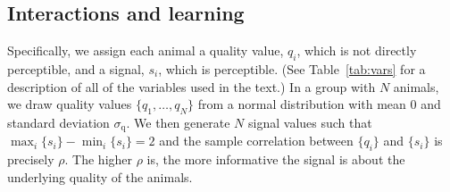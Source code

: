 \subsection{Interactions and learning }
Specifically, we assign each animal a quality value, $q_i$, which is not directly perceptible, and a signal, $s_i$, which is perceptible.  (See Table~\ref{tab:vars} for a description of all of the variables used in the text.) In a group with $N$ animals, we draw quality values $\{q_1,\dots,q_N\}$ from a normal distribution with mean $0$ and standard deviation $\sigma_\text{q}$. We then generate $N$ signal values such that 
$\max_i\{s_i\}-\min_i\{s_i\}=2$ and the sample correlation between $\{q_i\}$ and $\{s_i\}$ is precisely $\rho$. 
The higher $\rho$ is, the more informative the signal is about the underlying quality of the animals.
  
